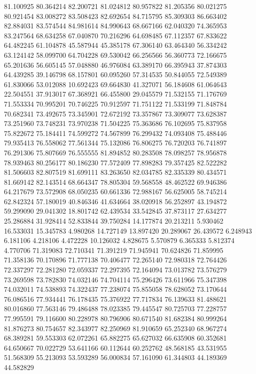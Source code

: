 81.100925
80.364214
82.200721
81.024812
80.957822
81.205356
80.021275
80.921454
83.008272
83.508423
82.692654
84.715795
85.309303
86.663402
82.884031
83.574544
84.981614
84.990643
68.667166
62.040320
74.365953
83.247564
68.634258
67.040870
70.216296
64.698485
67.112357
67.833622
64.482245
61.104878
45.587944
45.385178
67.306140
63.464340
56.334242
63.124142
58.099700
64.704228
69.530042
66.256566
56.360773
72.166675
65.201636
56.605145
57.048880
46.976084
63.389170
66.395943
37.874303
64.439285
39.146798
68.157801
60.095260
57.314535
50.844055
72.549389
61.830066
53.012088
10.692423
69.664830
41.327071
56.184608
61.064643
22.504551
37.913017
67.368921
66.455800
29.045579
71.532155
71.176769
71.553334
70.995201
70.746225
70.912597
71.751122
71.533199
71.848784
70.682341
73.492675
73.345901
72.672192
73.357867
73.309077
73.628387
73.251960
73.748231
73.970238
71.504225
75.363686
76.102695
75.837958
75.822672
75.184411
74.599272
74.567899
76.299432
74.093408
75.488446
79.935413
76.558062
77.561344
75.132086
76.806275
76.720203
76.741897
76.291306
75.807669
76.555555
81.894852
80.283508
78.098257
78.956878
78.939463
80.256177
80.186230
77.572409
77.898283
79.357425
82.522282
81.506603
82.807519
81.699111
83.263650
82.034785
82.335339
80.434571
81.669142
82.143514
68.664347
78.805304
59.568558
48.462522
69.946386
64.217679
73.572908
68.050235
60.661336
72.988167
56.625005
58.745214
62.842324
57.180019
40.846346
41.634664
38.020918
56.252897
43.194872
59.299090
29.041302
18.801742
62.439534
33.542845
37.873117
27.634277
25.286884
31.928414
52.833844
39.750284
14.177874
20.213211
5.930462
16.533031
15.345783
4.980268
14.727149
13.897420
20.289067
26.439572
6.248943
6.181106
4.218106
4.472228
10.126032
4.828675
5.570879
6.365333
5.812374
4.770706
71.319083
72.710341
71.391219
71.945941
70.624826
71.859995
71.358136
70.170896
71.777138
70.406477
72.265140
72.980318
72.764426
72.337297
72.281280
72.059337
72.297395
72.164094
73.013782
73.576279
73.269598
73.782830
74.032146
74.704114
75.296426
73.611966
75.347398
74.032011
74.538893
74.322437
77.238074
75.855058
78.628052
73.170644
76.086516
77.934441
76.178435
75.376922
77.717834
76.139633
81.488621
80.016860
77.563146
79.486488
78.023385
79.445547
80.725703
77.228757
77.995591
79.116600
80.228978
80.796906
80.671540
81.682384
80.999264
81.876273
80.754657
82.343977
82.250969
81.910659
65.252340
68.967274
68.389281
59.553303
62.072261
65.882275
65.627032
66.635908
60.352681
64.650667
70.022729
53.641166
60.112644
60.252762
48.568185
43.531955
51.568309
55.213093
53.593289
56.000834
57.161090
61.344803
44.189369
44.582829
